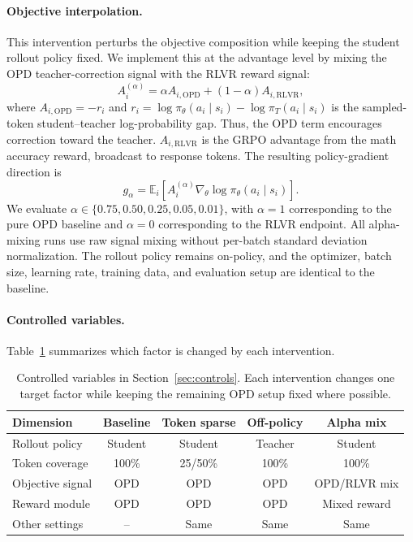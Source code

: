 \documentclass{llmxive}
\begin{document}
\paragraph{Objective interpolation.}
This intervention perturbs the objective composition while keeping the
student rollout policy fixed. We implement this at the advantage level by
mixing the OPD teacher-correction signal with the RLVR reward signal:
\begin{equation}
    A_i^{(\alpha)}
    =
    \alpha A_{i,\mathrm{OPD}}
    +
    (1-\alpha)A_{i,\mathrm{RLVR}},
    \label{eq:alpha-mixed-advantage}
\end{equation}
where $A_{i,\mathrm{OPD}}=-r_i$ and
$r_i=\log\pi_\theta(a_i\mid s_i)-\log\pi_T(a_i\mid s_i)$ is the
sampled-token student--teacher log-probability gap. Thus, the OPD term
encourages correction toward the teacher. $A_{i,\mathrm{RLVR}}$ is the
GRPO advantage from the math accuracy reward, broadcast to response tokens.
The resulting policy-gradient direction is
\begin{equation}
    g_{\alpha}
    =
    \mathbb{E}_i
    \left[
    A_i^{(\alpha)}
    \nabla_\theta
    \log \pi_\theta(a_i\mid s_i)
    \right].
    \label{eq:alpha-mixed-gradient}
\end{equation}
We evaluate
$\alpha\in\{0.75,0.50,0.25,0.05,0.01\}$, with $\alpha=1$ corresponding
to the pure OPD baseline and $\alpha=0$ corresponding to the RLVR endpoint.
All alpha-mixing runs use raw signal mixing without per-batch standard
deviation normalization. The rollout policy remains on-policy, and the
optimizer, batch size, learning rate, training data, and evaluation setup
are identical to the baseline.

\paragraph{Controlled variables.}
Table~\ref{tab:control-variables} summarizes which factor is changed by
each intervention.

\begin{table}[h]
\centering
\begin{tabular}{lcccc}
\toprule
Dimension & Baseline & Token sparse & Off-policy & Alpha mix \\
\midrule
Rollout policy & Student & Student & Teacher & Student \\
Token coverage & 100\% & 25/50\% & 100\% & 100\% \\
Objective signal & OPD & OPD & OPD & OPD/RLVR mix \\
Reward module & OPD & OPD & OPD & Mixed reward \\
Other settings & -- & Same & Same & Same \\
\bottomrule
\end{tabular}
\caption{
Controlled variables in Section~\ref{sec:controls}. Each intervention
changes one target factor while keeping the remaining OPD setup fixed where
possible.
}
\label{tab:control-variables}
\end{table}
\end{document}
